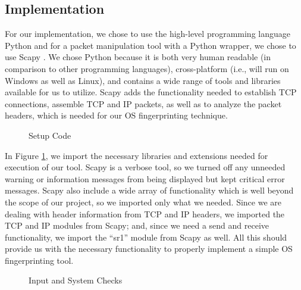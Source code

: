 \subsection{Implementation}

For our implementation, we chose to use the high-level programming language Python \cite{Python} and for a packet manipulation tool with a Python wrapper, we chose to use Scapy \cite{Scapy}.  We chose Python because it is both very human readable (in comparison to other programming languages), cross-platform (i.e., will run on Windows as well as Linux), and contains a wide range of tools and libraries available for us to utilize.  Scapy adds the functionality needed to establish TCP connections, assemble TCP and IP packets, as well as to analyze the packet headers, which is needed for our OS fingerprinting technique.

\begin{figure}
	\caption{\label{fig:setupCode} Setup Code}
\end{figure}

In Figure \ref{fig:setupCode}, we import the necessary libraries and extensions needed for execution of our tool. Scapy is a verbose tool, so we turned off any unneeded warning or information messages from being displayed but kept critical error messages.  Scapy also include a wide array of functionality which is well beyond the scope of our project, so we imported only what we needed.  Since we are dealing with header information from TCP and IP headers, we imported the TCP and IP modules from Scapy; and, since we need a send and receive functionality, we import the ``sr1'' module from Scapy as well.  All this should provide us with the necessary functionality to properly implement a simple OS fingerprinting tool.

\begin{figure}
	\caption{\label{fig:prepare} Input and System Checks}
\end{figure}

